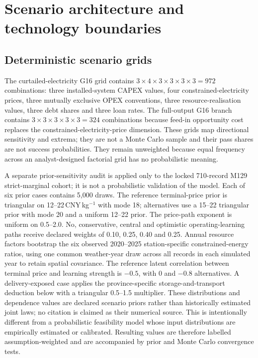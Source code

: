 \documentclass[pdflatex,sn-nature]{sn-jnl}
\begin{document}
\section{Scenario architecture and technology boundaries}\label{sec:scenarios}

\subsection{Deterministic scenario grids}

The curtailed-electricity G16 grid contains $3\times4\times3\times3\times3\times3=972$ combinations: three installed-system CAPEX values, four constrained-electricity prices, three mutually exclusive OPEX conventions, three resource-realisation values, three debt shares and three loan rates. The full-output G16 branch contains $3\times3\times3\times3\times3=324$ combinations because feed-in opportunity cost replaces the constrained-electricity-price dimension. These grids map directional sensitivity and extrema; they are not a Monte Carlo sample and their pass shares are not success probabilities. They remain unweighted because equal frequency across an analyst-designed factorial grid has no probabilistic meaning.

A separate prior-sensitivity audit is applied only to the locked 710-record M129 strict-marginal cohort; it is not a probabilistic validation of the model. Each of six prior cases contains 5,000 draws. The reference terminal-price prior is triangular on 12--22\,CNY\,kg$^{-1}$ with mode 18; alternatives use a 15--22 triangular prior with mode 20 and a uniform 12--22 prior. The price-path exponent is uniform on 0.5--2.0. No, conservative, central and optimistic operating-learning paths receive declared weights of 0.10, 0.25, 0.40 and 0.25. Annual resource factors bootstrap the six observed 2020--2025 station-specific constrained-energy ratios, using one common weather-year draw across all records in each simulated year to retain spatial covariance. The reference latent correlation between terminal price and learning strength is $-0.5$, with 0 and $-0.8$ alternatives. A delivery-exposed case applies the province-specific storage-and-transport deduction below with a triangular 0.5--1.5 multiplier. These distributions and dependence values are declared scenario priors rather than historically estimated joint laws; no citation is claimed as their numerical source. This is intentionally different from a probabilistic feasibility model whose input distributions are empirically estimated or calibrated\cite{odenweller2022}. Resulting values are therefore labelled assumption-weighted and are accompanied by prior and Monte Carlo convergence tests.
\end{document}
